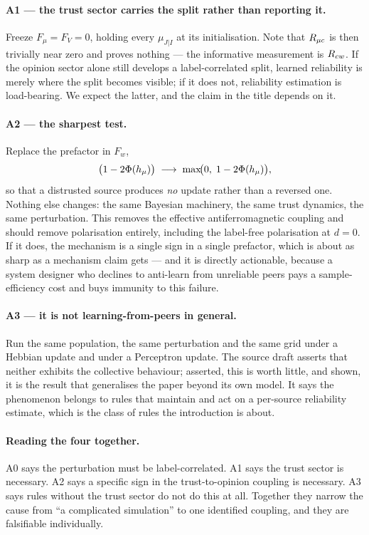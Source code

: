 \paragraph{A1 --- the trust sector carries the split rather than reporting it.}
Freeze $F_\mu = F_V = 0$, holding every $\mu_{J|I}$ at its initialisation. Note
that $R_{\mu c}$ is then trivially near zero and proves nothing --- the informative
measurement is $R_{cw}$. If the opinion sector alone still develops a
label-correlated split, learned reliability is merely where the split becomes
visible; if it does not, reliability estimation is load-bearing. We expect the
latter, and the claim in the title depends on it.

\paragraph{A2 --- the sharpest test.} Replace the prefactor in $F_w$,
\begin{equation}
  \bigl(1 - 2\Phi(h_{\mu})\bigr) \;\longrightarrow\; \max\!\bigl(0,\; 1 - 2\Phi(h_{\mu})\bigr),
\end{equation}
so that a distrusted source produces \emph{no} update rather than a reversed one.
Nothing else changes: the same Bayesian machinery, the same trust dynamics, the
same perturbation. This removes the effective antiferromagnetic coupling and
should remove polarisation entirely, including the label-free polarisation at
$d = 0$. If it does, the mechanism is a single sign in a single prefactor, which
is about as sharp as a mechanism claim gets --- and it is directly actionable,
because a system designer who declines to anti-learn from unreliable peers pays a
sample-efficiency cost and buys immunity to this failure.

\paragraph{A3 --- it is not learning-from-peers in general.} Run the same
population, the same perturbation and the same grid under a Hebbian update and
under a Perceptron update. The source draft asserts that neither exhibits the
collective behaviour; asserted, this is worth little, and shown, it is the result
that generalises the paper beyond its own model. It says the phenomenon belongs to
rules that maintain and act on a per-source reliability estimate, which is the
class of rules the introduction is about.


\paragraph{Reading the four together.} A0 says the perturbation must be
label-correlated. A1 says the trust sector is necessary. A2 says a specific sign
in the trust-to-opinion coupling is necessary. A3 says rules without the trust
sector do not do this at all. Together they narrow the cause from ``a complicated
simulation'' to one identified coupling, and they are falsifiable individually.
